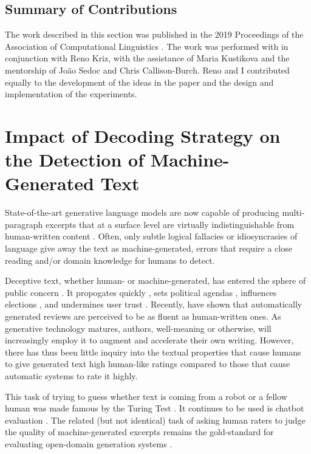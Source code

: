 \subsection{Summary of Contributions}
The work described in this section was published in the 2019 Proceedings of the Association of Computational Linguistics \citep{ippolito2019comparison}.
The work was performed with in conjunction with Reno Kriz, with the assistance of Maria Kustikova and the mentorship of Jo{\~a}o Sedoc and Chris Callison-Burch.
Reno and I contributed equally to the development of the ideas in the paper and the design and implementation of the experiments.

\section{Impact of Decoding Strategy on the Detection of Machine-Generated Text}
\label{section:detection}


State-of-the-art generative language models are now capable of producing multi-paragraph excerpts that at a surface level are virtually indistinguishable from human-written content \citep{zellers2019defending,radford2019language,adelani2020generating}.
Often, only subtle logical fallacies or idiosyncrasies of language give away the text as machine-generated, errors that require a close reading and/or domain knowledge for humans to detect.

Deceptive text, whether human- or machine-generated, has entered the sphere of public concern \citep{cooke2018fake}.
It propogates quickly \citep{vosoughi2018spread}, sets political agendas \citep{vargo2018agenda}, influences elections \citep{allcott2017social}, and undermines user trust \cite{wang2012serf, song2015crowdtarget}.
Recently, \citet{adelani2020generating} have shown that automatically generated reviews are perceived to be as fluent as human-written ones.
As generative technology matures, authors, well-meaning or otherwise, will increasingly employ it to augment and accelerate their own writing.
However, there has thus been little inquiry into the textual properties that cause humans to give generated text high human-like ratings compared to those that cause automatic systems to rate it highly.

This task of trying to guess whether text is coming from a robot or a fellow human was made famous by the Turing Test \citep{turing1950computing}.
It continues to be used is chatbot evaluation \citep{lowe2017towards}.
The related (but not identical) task of asking human raters to judge the quality of machine-generated excerpts remains the gold-standard for evaluating open-domain generation systems \citep{van2019best}.

